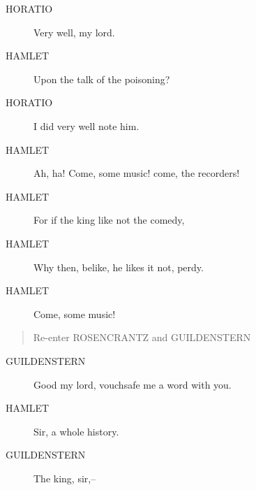 \documentclass{article}
\begin{document}
\begin{description}
            
\item[HORATIO] Very well, my lord.
\end{description}
          
\begin{description}
            
\item[HAMLET] Upon the talk of the poisoning?
\end{description}
          
\begin{description}
            
\item[HORATIO] I did very well note him.
\end{description}
          
\begin{description}
            
\item[HAMLET] Ah, ha! Come, some music! come, the recorders!
\item[HAMLET] For if the king like not the comedy,
\item[HAMLET] Why then, belike, he likes it not, perdy.
\item[HAMLET] Come, some music!
\end{description}
          
\begin{quote}
Re-enter ROSENCRANTZ and GUILDENSTERN
\end{quote}
          
\begin{description}
            
\item[GUILDENSTERN] Good my lord, vouchsafe me a word with you.
\end{description}
          
\begin{description}
            
\item[HAMLET] Sir, a whole history.
\end{description}
          
\begin{description}
            
\item[GUILDENSTERN] The king, sir,--
\end{description}
          
\end{document}
